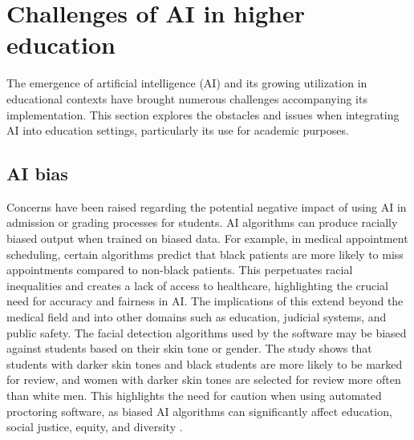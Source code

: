\section{Challenges of AI in higher education}
The emergence of artificial intelligence (AI) and its growing utilization in educational
contexts have brought numerous challenges accompanying its implementation.  This section explores the obstacles
and issues when integrating AI into education settings, particularly its use for academic purposes.
\subsection{AI bias}
Concerns have been raised regarding the potential negative impact of using AI in admission or
grading processes for students. AI algorithms can produce racially biased output when trained on biased data.
For example, in medical appointment scheduling, certain algorithms predict that black patients are more likely
to miss appointments compared to non-black patients. This perpetuates racial inequalities and creates a lack of
access to healthcare, highlighting the crucial need for accuracy and fairness in AI. The implications of this
extend beyond the medical field and into other domains such as education, judicial systems, and public safety\citep{shanklin_ethical_2022}.
The facial detection algorithms used by the software may be biased against students based on their skin tone or gender.
The study shows that students with darker skin tones and black students are more likely to be marked for review, and women
with darker skin tones are selected for review more often than white men. This highlights the need for caution when using
automated proctoring software, as biased AI algorithms can significantly affect education, social justice, equity, and diversity
\citep{yoder-himes_racial_2022}.


